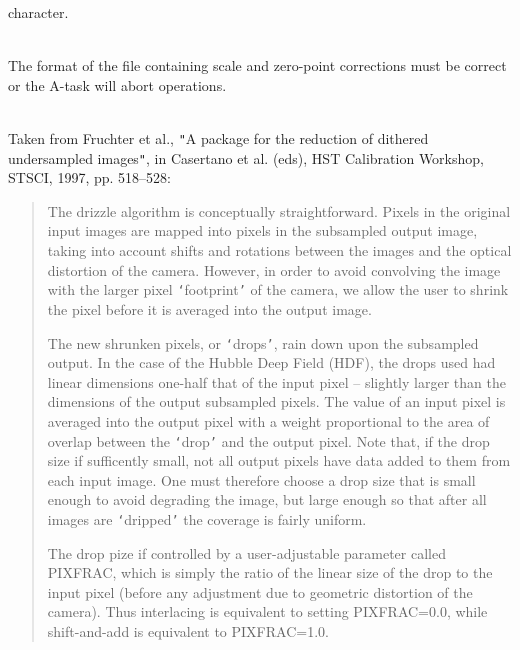 \documentclass[twoside,11pt]{article}
\renewcommand{\_}{\texttt{\symbol{95}}}
\newcommand{\sstdiytopic}[2]{\item[#1:] \mbox{} \\[1.3ex] #2}
\newcommand{\sstdiytopic}[2]{\item[{#1}] #2 }
\begin{document}
{{      character.
   }
   \sstdiytopic{
      Pitfalls
   }{
      The format of the file containing scale and zero-point corrections
      must be correct or the A-task will abort operations.
   }
   \sstdiytopic{
      Algorithms Used
   }{
      Taken from Fruchter et al., {\tt "}A package for the reduction of dithered
      undersampled images{\tt "}, in Casertano et al. (eds), HST Calibration
      Workshop, STSCI, 1997, pp. 518--528:
      \begin{quotation}
       The drizzle algorithm is conceptually straightforward. Pixels in
       the original input images are mapped into pixels in the subsampled
       output image, taking into account shifts and rotations between the
       images and the optical distortion of the camera. However, in order
       to avoid convolving the image with the larger pixel {\tt `}footprint{\tt '} of
       the camera, we allow the user to shrink the pixel before it is
       averaged into the output image.

       The new shrunken pixels, or {\tt `}drops{\tt '}, rain down upon the subsampled
       output. In the case of the Hubble Deep Field (HDF), the drops used
       had linear dimensions one-half that of the input pixel -- slightly
       larger than the dimensions of the output subsampled pixels. The value
       of an input pixel is averaged into the output pixel with a weight
       proportional to the area of overlap between the {\tt `}drop{\tt '} and the output
       pixel. Note that, if the drop size if sufficently small, not all
       output pixels have data added to them from each input image. One
       must therefore choose a drop size that is small enough to avoid
       degrading the image, but large enough so that after all images
       are {\tt `}dripped{\tt '} the coverage is fairly uniform.

       The drop pize if controlled by a user-adjustable parameter called
       PIXFRAC, which is simply the ratio of the linear size of the drop to
       the input pixel (before any adjustment due to geometric distortion
       of the camera). Thus interlacing is equivalent to setting PIXFRAC=0.0,
       while shift-and-add is equivalent to PIXFRAC=1.0.


\end{quotation}}}
\end{document}
